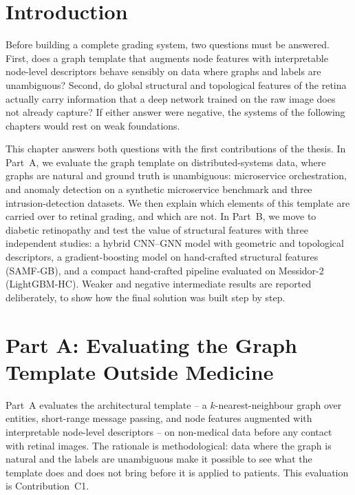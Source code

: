 \section*{Introduction}

Before building a complete grading system, two questions must be answered. First, does
a graph template that augments node features with interpretable node-level descriptors
behave sensibly on data where graphs and labels are unambiguous? Second, do global
structural and topological features of the retina actually carry information that a deep
network trained on the raw image does not already capture? If either answer were
negative, the systems of the following chapters would rest on weak foundations.

This chapter answers both questions with the first contributions of the thesis. In
Part~A, we evaluate the graph template on distributed-systems data, where graphs are
natural and ground truth is unambiguous: microservice orchestration, and anomaly
detection on a synthetic microservice benchmark and three intrusion-detection datasets.
We then explain which elements of this template are carried over to retinal grading, and
which are not. In Part~B, we move to diabetic retinopathy and test the value of structural
features with three independent studies: a hybrid CNN--GNN model with geometric and
topological descriptors, a gradient-boosting model on hand-crafted structural features
(SAMF-GB), and a compact hand-crafted pipeline evaluated on Messidor-2 (LightGBM-HC).
Weaker and negative intermediate results are reported deliberately, to show how the final
solution was built step by step.

\section{Part A: Evaluating the Graph Template Outside Medicine}
\label{sec:ch2-rationale}

Part~A evaluates the architectural template -- a $k$-nearest-neighbour graph over
entities, short-range message passing, and node features augmented with interpretable
node-level descriptors -- on non-medical data before any contact with retinal images.
The rationale is methodological: data where the graph is natural and the labels are
unambiguous make it possible to see what the template does and does not bring before
it is applied to patients. This evaluation is Contribution~C1.


